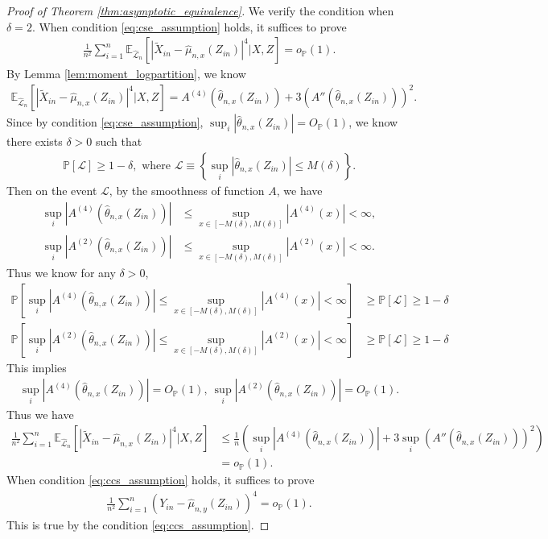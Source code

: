 \documentclass[12pt]{article}
\theoremstyle{definition}
\def\P{\mathbb{P}}
\def\P{\mathbb{P}}
\newcommand{\E}{\mathbb E}								%
\renewcommand{\P}{\mathbb{P}}							%
\newcommand{\srx}{X}									%
\newcommand{\srz}{Z}									%
\newcommand{\srxk}{\widetilde X}						%
\newcommand{\sry}{Y}									%
\newcommand{\lawhat}{\widehat{\mathcal L}}				%
\begin{document}
\begin{proof}[Proof of Theorem \ref{thm:asymptotic_equivalence}]
  We verify the condition when $\delta=2$. When condition \eqref{eq:cse_assumption} holds, it suffices to prove 
  \begin{align*}
    \frac{1}{n^2}\sum_{i=1}^n \E_{\lawhat_n}[|\srxk_{in}-\widehat\mu_{n,x}(\srz_{in})|^4|\srx,\srz]=o_{\P}(1).
  \end{align*}
  By Lemma \ref{lem:moment_logpartition}, we know 
  \begin{align*}
    \E_{\lawhat_n}[|\srxk_{in}-\widehat\mu_{n,x}(\srz_{in})|^4|\srx,\srz]=A^{(4)}(\widehat{\theta}_{n,x}(\srz_{in}))+3(A''(\widehat{\theta}_{n,x}(\srz_{in})))^2. 
  \end{align*}
  Since by condition \eqref{eq:cse_assumption}, $\sup_{i}|\widehat{\theta}_{n,x}(\srz_{in})|=O_{\P}(1)$, we know there exists $\delta>0$ such that 
  \begin{align*}
    \P\left[\mathcal{L}\right]\geq 1-\delta,\text{ where }\mathcal{L}\equiv \left\{\sup_{i}|\widehat{\theta}_{n,x}(\srz_{in})|\leq M(\delta)\right\}.
  \end{align*}
  Then on the event $\mathcal{L}$, by the smoothness of function $A$, we have
  \begin{align*}
    \sup_i|A^{(4)}(\widehat{\theta}_{n,x}(\srz_{in}))|
    &
    \leq \sup_{x\in [-M(\delta),M(\delta)]}|A^{(4)}(x)|<\infty,\\ 
    \sup_i|A^{(2)}(\widehat{\theta}_{n,x}(\srz_{in}))|
    &
    \leq \sup_{x\in [-M(\delta),M(\delta)]}|A^{(2)}(x)|<\infty.
  \end{align*}
  Thus we know for any $\delta>0$,
  \begin{align*}
    \P\left[\sup_{i}|A^{(4)}(\widehat{\theta}_{n,x}(\srz_{in}))|\leq \sup_{x\in [-M(\delta),M(\delta)]}|A^{(4)}(x)|<\infty\right]
    &
    \geq\P[\mathcal{L}]\geq 1-\delta\\
    \P\left[\sup_{i}|A^{(2)}(\widehat{\theta}_{n,x}(\srz_{in}))|\leq \sup_{x\in [-M(\delta),M(\delta)]}|A^{(2)}(x)|<\infty\right]
    &
    \geq\P[\mathcal{L}]\geq 1-\delta
  \end{align*}
  This implies
  \begin{align*}
    \sup_i|A^{(4)}(\widehat{\theta}_{n,x}(\srz_{in}))|=O_{\P}(1),\ \sup_i |A^{(2)}(\widehat{\theta}_{n,x}(\srz_{in}))|=O_{\P}(1).
  \end{align*}
  Thus we have 
  \begin{align*}
    \frac{1}{n^2}\sum_{i=1}^n \E_{\lawhat_n}[|\srxk_{in}-\widehat\mu_{n,x}(\srz_{in})|^4|\srx,\srz]
    &
    \leq \frac{1}{n}\left(\sup_i|A^{(4)}(\widehat{\theta}_{n,x}(\srz_{in}))|+3\sup_i(A''(\widehat{\theta}_{n,x}(\srz_{in})))^2\right)\\
    &
    =o_{\P}(1).
  \end{align*}
  When condition \eqref{eq:ccs_assumption} holds, it suffices to prove 
  \begin{align*}
    \frac{1}{n^2}\sum_{i=1}^n (\sry_{in}-\widehat{\mu}_{n,y}(\srz_{in}))^4=o_{\P}(1).
  \end{align*}
  This is true by the condition \eqref{eq:ccs_assumption}.


\end{proof}
\end{document}
